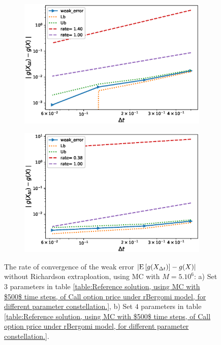 \FloatBarrier


\begin{figure}[!htb]
	\centering
	\begin{subfigure}{.35\textwidth}
		\centering
		\includegraphics[width=1\linewidth]{./figures/rBergomi_weak_error_rates/without_richardson/H_002/weak_convergence_order_Bergomi_H_002_K_1_M_3_10_6_CI_relative}
		\caption{}
		\label{fig:sub3}
	\end{subfigure}%
	\begin{subfigure}{.35\textwidth}
		\centering
		\includegraphics[width=1\linewidth]{./figures/rBergomi_weak_error_rates/without_richardson/H_002/weak_convergence_order_Bergomi_H_002_K_08_M_5_10_6_CI_relative}
		\caption{}
		\label{fig:sub4}
	\end{subfigure}
	
	\caption{The rate of convergence of the weak error $\left\lvert\mathrm{E}\left[g(X_{\Delta t})\right]-g(X)\right\rvert$  without Richardson extraploation, using MC with $M=5.10^6$: a) Set $3$ parameters in table \ref{table:Reference solution, using MC with $500$ time steps, of Call option price under rBergomi model, for different parameter constellation.},  b) Set $4$ parameters in table \ref{table:Reference solution, using MC with $500$ time steps, of Call option price under rBergomi model, for different parameter constellation.}. }
	\label{fig:Weak_rate_H_002_without_rich_K_1_K_08}
\end{figure}

